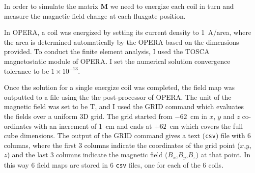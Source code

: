 In order to simulate the matrix $\mathbf{M}$ we need to energize each
coil in turn and measure the magnetic field change at each fluxgate
position.

In OPERA, a coil was energized by setting its current density to
1~A/area, where the area is determined automatically by the OPERA
based on the dimensions provided.  To conduct the finite element
analysis, I used the TOSCA magnetostatic module of OPERA.  I set the
numerical solution convergence tolerance to be $1\times10^{-13}$.

Once the solution for a single energize coil was completed, the field
map was outputted to a file using the the post-processor of OPERA.
The unit of the magnetic field was set to be T, and I used the GRID
command which evaluates the fields over a uniform 3D grid. The grid
started from $-62$~cm in $x$, $y$ and $z$ co-ordinates with an
increment of 1~cm and ends at $+62$~cm which covers the full cube
dimensions.  The output of the GRID command gives a text ({\tt csv})
file with 6 columns, where the first 3 columns indicate the
coordinates of the grid point ($x$,$y$,$z$) and the last 3 columns
indicate the magnetic field ($B_x$,$B_y$,$B_z$) at that point.  In
this way 6 field maps are stored in 6 {\tt csv} files, one for each of
the 6 coils.





